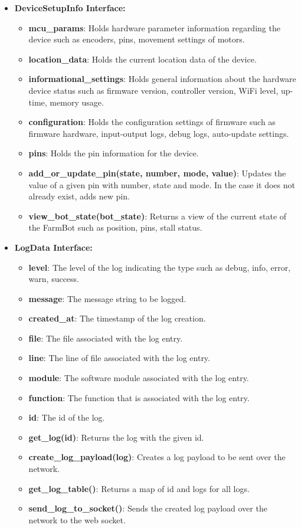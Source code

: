 \begin{itemize}
    \item \textbf{DeviceSetupInfo Interface:} \begin{itemize}
        \item \textbf{mcu\_params}: Holds hardware parameter information regarding the device such as encoders, pins, movement settings of motors.
        \item \textbf{location\_data}: Holds the current location data of the device.
        \item \textbf{informational\_settings}: Holds general information about the hardware device status such as firmware version, controller version, WiFi level, up-time, memory usage.
        \item \textbf{configuration}: Holds the configuration settings of firmware such as firmware hardware, input-output logs, debug logs, auto-update settings.
        \item \textbf{pins}: Holds the pin information for the device.
        \item \textbf{add\_or\_update\_pin(state, number, mode, value)}: Updates the value of a given pin with number, state and mode. In the case it does not already exist, adds new pin.
        \item \textbf{view\_bot\_state(bot\_state)}: Returns a view of the current state of the FarmBot such as position, pins, stall status.
    \end{itemize}

    \item \textbf{LogData Interface:}
    \begin{itemize}
        \item \textbf{level}: The level of the log indicating the type such as debug, info, error, warn, success.
        \item \textbf{message}: The message string to be logged.
        \item \textbf{created\_at}: The timestamp of the log creation.
        \item \textbf{file}: The file associated with the log entry.
        \item \textbf{line}: The line of file associated with the log entry.
        \item \textbf{module}: The software module associated with the log entry.
        \item \textbf{function}: The function that is associated with the log entry.
        \item \textbf{id}: The id of the log.
        \item \textbf{get\_log(id)}: Returns the log with the given id.
        \item \textbf{create\_log\_payload(log)}: Creates a log payload to be sent over the network.
        \item \textbf{get\_log\_table()}: Returns a map of id and logs for all logs.
        \item \textbf{send\_log\_to\_socket()}: Sends the created log payload over the network to the web socket.
    \end{itemize}

    
\end{itemize}

